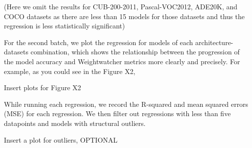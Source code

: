 
(Here we omit the results for CUB-200-2011, Pascal-VOC2012, ADE20K, and COCO datasets as there are less than 15 models for those datasets and thus the regression is less statistically significant)


For the second batch, we plot the regression for models of each architecture-datasets combination, which shows the relationship between the progression of the model accuracy and Weightwatcher metrics more clearly and precisely. For example, as you could see in the Figure X2, 


Insert plots for Figure X2

While running each regression, we record the R-squared and mean squared errors (MSE) for each regression. We then filter out regressions with less than five datapoints and models with structural outliers.


Insert a plot for outliers, OPTIONAL
